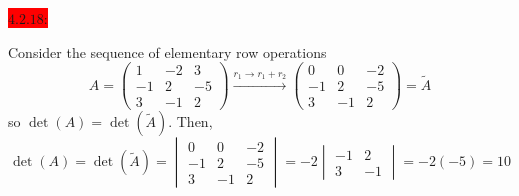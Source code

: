 \documentclass{exam}
\begin{document}
  \colorbox{red}{\underline{$4.2.18$}:}
  \begin{solution}
    Consider the sequence of elementary row operations 
    \[
      A = \begin{pmatrix}
        1 & -2 & 3 \\
        -1 & 2 & -5 \\
        3 & -1 & 2
      \end{pmatrix}
      \xrightarrow{r_1 \to r_1 + r_2}
      \begin{pmatrix}
        0 & 0 & -2 \\
        -1 & 2 & -5 \\
        3 & -1 & 2
      \end{pmatrix}
      = \tilde{A}
    \]
    so $\det(A) = \det(\tilde{A})$. Then,
    \[
      \det(A) = \det(\tilde{A}) = \begin{vmatrix}
        0 & 0 & -2 \\
        -1 & 2 & -5 \\
        3 & -1 & 2
      \end{vmatrix} 
      = -2\begin{vmatrix}
        -1 & 2 \\ 3 & -1
      \end{vmatrix}
      = -2(-5) = \boxed{10}
    \]
  \end{solution}
\end{document}
